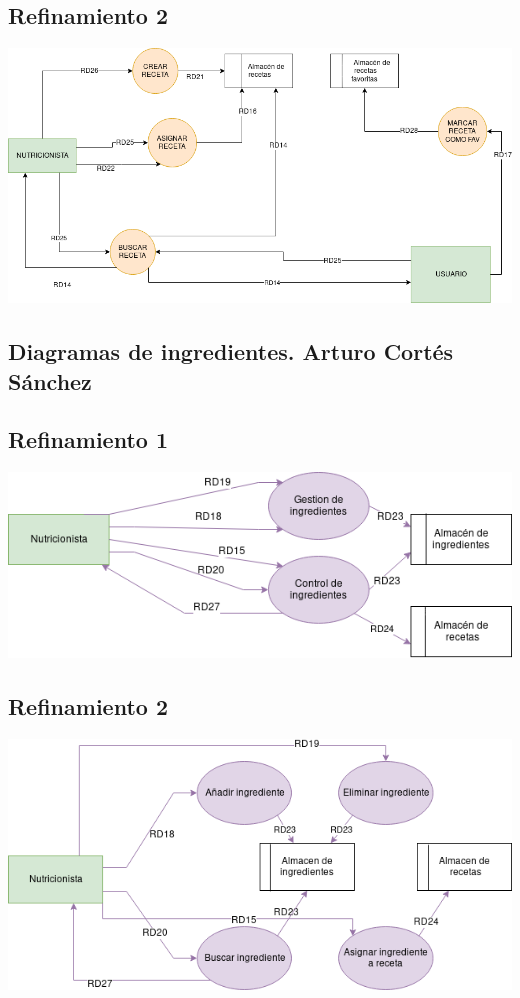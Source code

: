 \documentclass[12pt,letterpaper]{article}
\begin{document}
\subsection{Refinamiento 2}
\includegraphics[scale=0.5]{Refinamiento_2_Recetas.png}
\newpage
\subsection{Diagramas de ingredientes. Arturo Cortés Sánchez}
\subsection{Refinamiento 1}
\includegraphics[scale=0.7]{Refinamineto_ingredientes.png}
\subsection{Refinamiento 2}
\includegraphics[scale=0.7]{Refinamiento_ingredientes_2.png}
\newpage
\end{document}
